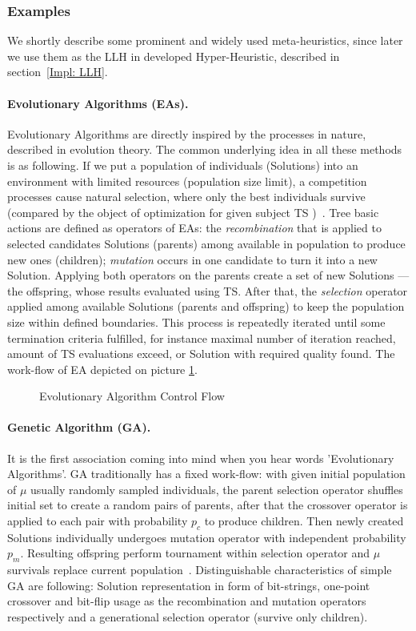 \subsubsection{Examples}\label{BG: MH Examples}
We shortly describe some prominent and widely used meta-heuristics, since later we use them as the LLH in developed Hyper-Heuristic, described in section~\ref{Impl: LLH}.


\paragraph{Evolutionary Algorithms (EAs).} Evolutionary Algorithms are directly inspired by the processes in nature, described in evolution theory. The common underlying idea in all these methods is as following. If we put a population of individuals (Solutions) into an environment with limited resources (population size limit), a competition processes cause natural selection, where only the best individuals survive (compared by the object of optimization for given subject TS )~\cite{eiben2015evolutionary}.
Tree basic actions are defined as operators of EAs: the \textit{recombination} that is applied to selected candidates Solutions (parents) among available in population to produce new ones (children); \textit{mutation} occurs in one candidate to turn it into a new Solution. Applying both operators on the parents create a set of new Solutions — the offspring, whose results evaluated using TS. After that, the \textit{selection} operator applied among available Solutions (parents and offspring) to keep the population size within defined boundaries. This process is repeatedly iterated until some termination criteria fulfilled, for instance maximal number of iteration reached, amount of TS evaluations exceed, or Solution with required quality found. The work-flow of EA depicted on picture \ref{bg:pic:EAs}.

\begin{figure}
	\centering
	
	\caption{Evolutionary Algorithm Control Flow}
	\label{bg:pic:EAs}
\end{figure}

\paragraph{Genetic Algorithm (GA).} It is the first association coming into mind when you hear words 'Evolutionary Algorithms'. GA traditionally has a fixed work-flow: with given initial population of $\mu$ usually randomly sampled individuals, the parent selection operator shuffles initial set to create a random pairs of parents, after that the crossover operator is applied to each pair with probability $p_c$ to produce children. Then newly created Solutions individually undergoes mutation operator with independent probability $p_m$. Resulting offspring perform tournament within selection operator and $\mu$ survivals replace current population~\cite{eiben2015popular}. Distinguishable characteristics of simple GA are following: Solution representation in form of bit-strings, one-point crossover and bit-flip usage as the recombination and mutation operators respectively and a generational selection operator (survive only children).

